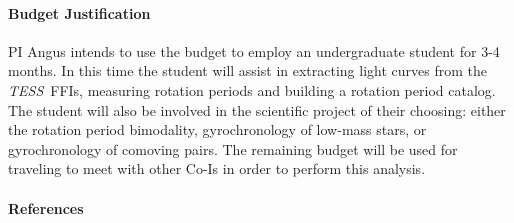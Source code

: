 \documentclass[letterpaper,12pt,preprint]{hack_aastex}
\newcommand{\tess}{{\it TESS}}
\begin{document}
\paragraph{Budget Justification}
PI Angus intends to use the budget to employ an undergraduate student for 3-4
months.
In this time the student will assist in extracting light curves from the
\tess\ FFIs, measuring rotation periods and building a rotation period
catalog.
The student will also be involved in the scientific project of their choosing:
either the rotation period bimodality, gyrochronology of low-mass stars, or
gyrochronology of comoving pairs.
The remaining budget will be used for traveling to meet with other Co-Is in
order to perform this analysis.
\paragraph{References}

{\footnotesize

}
\end{document}

